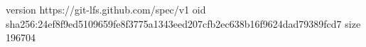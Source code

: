 version https://git-lfs.github.com/spec/v1
oid sha256:24ef8f9ed5109659fe8f3775a1343eed207cfb2ec638b16f9624dad79389fcd7
size 196704

